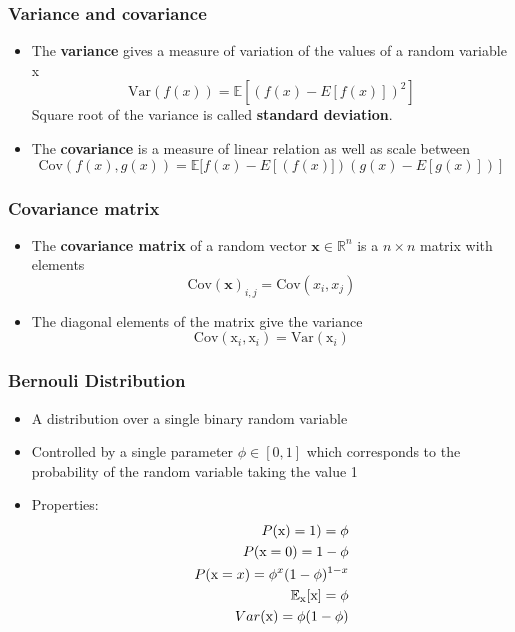 \documentclass[notes]{beamer}          %
\newcommand{\vect}[1]{\bm{#1}}
\newcommand{\field}[1]{\mathbb{#1}}
\newcommand{\R}{\field{R}}
\begin{document}
\begin{frame}
\frametitle{Variance and covariance}
\begin{itemize}
    \item The {\bf variance} gives a measure of variation of the values of a random variable x $$\mbox{Var}(f(x)) = \field{E}[(f(x) - E[f(x)])^2]$$
    Square root of the variance is called {\bf standard deviation}.

    \item The {\bf covariance} is a measure of linear relation as well as scale between $$\mbox{Cov}(f(x),g(x)) = \field{E}[f(x) - E[(f(x)])(g(x) - E[g(x)])]$$
\end{itemize}

\end{frame}


\begin{frame}
\frametitle{Covariance matrix}
    \begin{itemize}
        \item The {\bf covariance matrix} of a random vector $\vect{x} \in \R^n$ is a $n \times n$ matrix with elements
    $$
    \mbox{Cov}(\vect{x})_{i,j} = \mbox{Cov}(x_i,x_j)
    $$
    \item The diagonal elements of the matrix give the variance
    $$
      \mbox{Cov}(\text{x}_i,\text{x}_i) = \mbox{Var}(\text{x}_i)
    $$
    \end{itemize}

\end{frame}



\begin{frame}
\frametitle{Bernouli Distribution}
\begin{itemize}
    \item A distribution over a single binary random variable
    \item Controlled by a single parameter $\phi \in [0,1]$ which corresponds to the probability of the random variable taking the value 1
    \item Properties:
    \begin{eqnarray*}
    P({\rm x}) = 1) = \phi \\
    P({\rm x} = 0) = 1 - \phi \\
    P({\rm x} = x) = \phi^x (1-\phi)^{1-x} \\
    \field{E}_\text{x}[\text{x}] = \phi \\
    Var(\text{x}) = \phi(1-\phi)
    \end{eqnarray*}
\end{itemize}
\end{frame}
\end{document}
